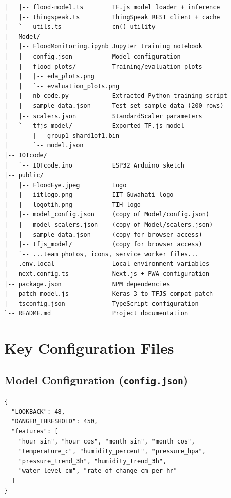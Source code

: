\begin{lstlisting}[language={},caption={Top-level project folder structure}]
|   |-- flood-model.ts        TF.js model loader + inference
|   |-- thingspeak.ts         ThingSpeak REST client + cache
|   `-- utils.ts              cn() utility
|-- Model/
|   |-- FloodMonitoring.ipynb Jupyter training notebook
|   |-- config.json           Model configuration
|   |-- flood_plots/          Training/evaluation plots
|   |   |-- eda_plots.png
|   |   `-- evaluation_plots.png
|   |-- nb_code.py            Extracted Python training script
|   |-- sample_data.json      Test-set sample data (200 rows)
|   |-- scalers.json          StandardScaler parameters
|   `-- tfjs_model/           Exported TF.js model
|       |-- group1-shard1of1.bin
|       `-- model.json
|-- IOTcode/
|   `-- IOTcode.ino           ESP32 Arduino sketch
|-- public/
|   |-- FloodEye.jpeg         Logo
|   |-- iitlogo.png           IIT Guwahati logo
|   |-- logotih.png           TIH logo
|   |-- model_config.json     (copy of Model/config.json)
|   |-- model_scalers.json    (copy of Model/scalers.json)
|   |-- sample_data.json      (copy for browser access)
|   |-- tfjs_model/           (copy for browser access)
|   `-- ...team photos, icons, service worker files...
|-- .env.local                Local environment variables
|-- next.config.ts            Next.js + PWA configuration
|-- package.json              NPM dependencies
|-- patch_model.js            Keras 3 to TFJS compat patch
|-- tsconfig.json             TypeScript configuration
`-- README.md                 Project documentation
\end{lstlisting}

\chapter{Key Configuration Files}
\label{app:config}

\section{Model Configuration (\texttt{config.\allowbreak{}json})}

\begin{lstlisting}[language={},caption={Model/config.json}]
{
  "LOOKBACK": 48,
  "DANGER_THRESHOLD": 450,
  "features": [
    "hour_sin", "hour_cos", "month_sin", "month_cos",
    "temperature_c", "humidity_percent", "pressure_hpa",
    "pressure_trend_3h", "humidity_trend_3h",
    "water_level_cm", "rate_of_change_cm_per_hr"
  ]
}
\end{lstlisting}

